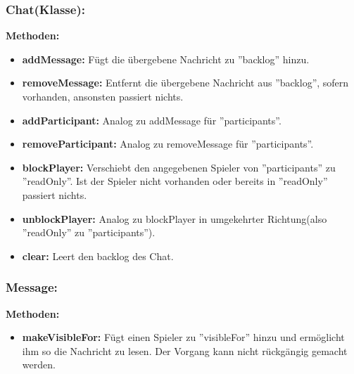 \documentclass[fontsize=12pt,paper=a4,twoside]{scrartcl}
\begin{document}
\subsubsection{Chat(Klasse):}
\textbf{Methoden:}
\begin{itemize}
	\item \textbf{addMessage:} Fügt die übergebene Nachricht zu ''backlog'' hinzu.
	\item \textbf{removeMessage:} Entfernt die übergebene Nachricht aus ''backlog'', sofern vorhanden, ansonsten passiert nichts.
	\item \textbf{addParticipant:} Analog zu addMessage für ''participants''.
	\item \textbf{removeParticipant:} Analog zu removeMessage für ''participants''.
	\item \textbf{blockPlayer:} Verschiebt den angegebenen Spieler von ''participants'' zu ''readOnly''. Ist der Spieler nicht vorhanden oder bereits in ''readOnly'' passiert nichts.
	\item \textbf{unblockPlayer:} Analog zu blockPlayer in umgekehrter Richtung(also ''readOnly'' zu ''participants'').
	\item \textbf{clear:} Leert den backlog des Chat.
\end{itemize}

\subsubsection{Message:}
\textbf{Methoden:}
\begin{itemize}
	\item \textbf{makeVisibleFor:} Fügt einen Spieler zu ''visibleFor'' hinzu und ermöglicht ihm so die Nachricht zu lesen. Der Vorgang kann nicht rückgängig gemacht werden.
\end{itemize}
\end{document}
